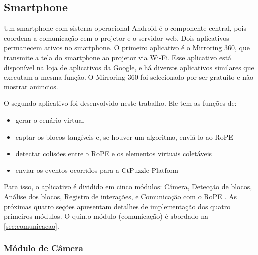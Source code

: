 \subsection{Smartphone}
\label{sec:smartphone}
Um smartphone com sistema operacional Android é o componente central, pois coordena a comunicação com o projetor e o servidor web. Dois aplicativos permanecem ativos no smartphone. O primeiro aplicativo é o Mirroring 360, que transmite a tela do smartphone ao projetor via Wi-Fi. Esse aplicativo está disponível na loja de aplicativos da Google, e há diversos aplicativos similares que executam a mesma função. O Mirroring 360 foi selecionado por ser gratuito e não mostrar anúncios.

O segundo aplicativo foi desenvolvido neste trabalho. Ele tem as funções de:
\begin{itemize}
    \item gerar o cenário virtual
    \item captar os blocos tangíveis e, se houver um algoritmo, enviá-lo ao RoPE
    \item detectar colisões entre o RoPE e os elementos virtuais coletáveis
    \item enviar os eventos ocorridos para a CtPuzzle Platform
\end{itemize}

Para isso, o aplicativo é dividido em cinco módulos: Câmera, Detecção de blocos, Análise dos blocos, Registro de interações, e Comunicação com o RoPE . As próximas quatro seções apresentam detalhes de implementação dos quatro primeiros módulos. O quinto módulo (comunicação) é abordado na \autoref{sec:comunicacao}.


\subsubsection{Módulo de Câmera}
\label{sec:camera}


